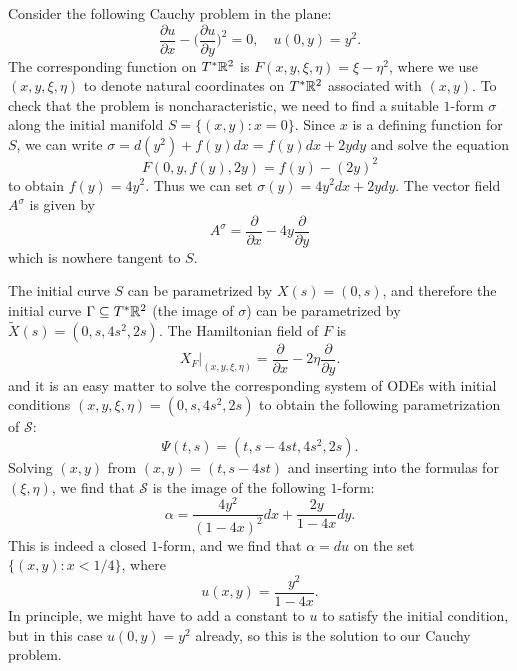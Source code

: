 \begin{example}
Consider the following Cauchy problem in the plane:
\[\frac{\partial u}{\partial x}-\Big(\frac{\partial u}{\partial y}\Big)^2=0,\quad u(0,y)=y^2.\]
The corresponding function on $T^*\mathbb{R}^2$ is $F(x,y,\xi,\eta)=\xi-\eta^2$, where we use $(x,y,\xi,\eta)$ to denote natural coordinates on $T^*\mathbb{R}^2$ associated with $(x,y)$. To check that the problem is noncharacteristic, we need to find a suitable $1$-form $\sigma$ along the initial manifold $S=\{(x,y):x=0\}$. Since $x$ is a defining function for $S$, we can write $\sigma=d(y^2)+f(y)dx=f(y)dx+2ydy$ and solve the equation
\[F(0,y,f(y),2y)=f(y)-(2y)^2\]
to obtain $f(y)=4y^2$. Thus we can set $\sigma(y)=4y^2dx+2ydy$. The vector field $A^\sigma$ is given by
\[A^\sigma=\frac{\partial}{\partial x}-4y\frac{\partial}{\partial y}\]
which is nowhere tangent to $S$.\par
The initial curve $S$ can be parametrized by $X(s)=(0,s)$, and therefore the initial curve $\Gamma\subseteq T^*\mathbb{R}^2$ (the image of $\sigma$) can be parametrized by $\widetilde{X}(s)=(0,s,4s^2,2s)$. The Hamiltonian field of $F$ is
\[X_F|_{(x,y,\xi,\eta)}=\frac{\partial}{\partial x}-2\eta\frac{\partial}{\partial y}.\]
and it is an easy matter to solve the corresponding system of ODEs with initial conditions $(x,y,\xi,\eta)=(0,s,4s^2,2s)$ to obtain the following parametrization of $\mathcal{S}$:
\[\varPsi(t,s)=(t,s-4st,4s^2,2s).\]
Solving $(x,y)$ from $(x,y)=(t,s-4st)$ and inserting into the formulas for $(\xi,\eta)$, we find that $\mathcal{S}$ is the image of the following $1$-form:
\[\alpha=\frac{4y^2}{(1-4x)^2}dx+\frac{2y}{1-4x}dy.\]
This is indeed a closed $1$-form, and we find that $\alpha=du$ on the set $\{(x,y):x<1/4\}$, where
\[u(x,y)=\frac{y^2}{1-4x}.\]
In principle, we might have to add a constant to $u$ to satisfy the initial condition, but in this case $u(0,y)=y^2$ already, so this is the solution to our Cauchy problem.
\end{example}

